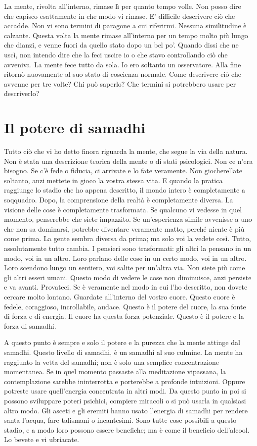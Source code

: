 La mente, rivolta all'interno, rimase lì per quanto tempo volle. Non
posso dire che capisco esattamente in che modo vi rimase. E' difficile
descrivere ciò che accadde. Non vi sono termini di paragone a cui
riferirmi. Nessuna similitudine è calzante. Questa volta la mente rimase
all'interno per un tempo molto più lungo che dianzi, e venne fuori da
quello stato dopo un bel po'. Quando dissi che ne uscì, non intendo dire
che la feci uscire io o che stavo controllando ciò che avveniva. La
mente fece tutto da sola. Io ero soltanto un osservatore. Alla fine
ritornò nuovamente al suo stato di coscienza normale. Come descrivere
ciò che avvenne per tre volte? Chi può saperlo? Che termini si
potrebbero usare per descriverlo?

\section{Il potere di samadhi}

Tutto ciò che vi ho detto finora riguarda la mente, che segue la via
della natura. Non è stata una descrizione teorica della mente o di stati
psicologici. Non ce n'era bisogno. Se c'è fede o fiducia, ci arrivate e
lo fate veramente. Non giocherellate soltanto, anzi mettete in gioco la
vostra stessa vita. E quando la pratica raggiunge lo stadio che ho
appena descritto, il mondo intero è completamente a soqquadro. Dopo, la
comprensione della realtà è completamente diversa. La visione delle cose
è completamente trasformata. Se qualcuno vi vedesse in quel momento,
penserebbe che siete impazzito. Se un'esperienza simile avvenisse a uno
che non sa dominarsi, potrebbe diventare veramente matto, perché niente
è più come prima. La gente sembra diversa da prima; ma solo voi la
vedete così. Tutto, assolutamente tutto cambia. I pensieri sono
trasformati: gli altri la pensano in un modo, voi in un altro. Loro
parlano delle cose in un certo modo, voi in un altro. Loro scendono
lungo un sentiero, voi salite per un'altra via. Non siete più come gli
altri esseri umani. Questo modo di vedere le cose non diminuisce, anzi
persiste e va avanti. Provateci. Se è veramente nel modo in cui l'ho
descritto, non dovete cercare molto lontano. Guardate all'interno del
vostro cuore. Questo cuore è fedele, coraggioso, incrollabile, audace.
Questo è il potere del cuore, la sua fonte di forza e di energia. Il
cuore ha questa forza potenziale. Questo è il potere e la forza di
samadhi.

A questo punto è sempre e solo il potere e la purezza che la mente
attinge dal samadhi. Questo livello di samadhi, è un samadhi al suo
culmine. La mente ha raggiunto la vetta del samadhi; non è solo una
semplice concentrazione momentanea. Se in quel momento passaste alla
meditazione vipassana, la contemplazione sarebbe ininterrotta e
porterebbe a profonde intuizioni. Oppure potreste usare quell'energia
concentrata in altri modi. Da questo punto in poi si possono sviluppare
poteri psichici, compiere miracoli o si può usarla in qualsiasi altro
modo. Gli asceti e gli eremiti hanno usato l'energia di samadhi per
rendere santa l'acqua, fare talismani o incantesimi. Sono tutte cose
possibili a questo stadio, e a modo loro possono essere benefiche; ma è
come il beneficio dell'alcool. Lo bevete e vi ubriacate.

